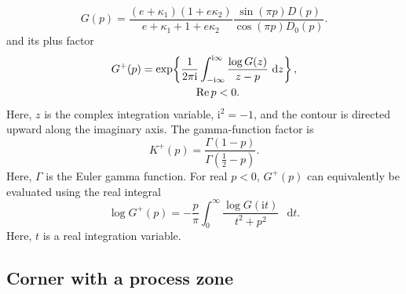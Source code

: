 \documentclass[pdflatex,iicol,sn-mathphys-ay]{sn-jnl}
\newcommand{\dd}{\mathop{}\!\mathrm{d}}
\newcommand{\ii}{\mathrm{i}}
\begin{document}
\begin{appendices}
\begin{equation*}
  G(p)=
  \frac{(e+\kappa_1)(1+e\kappa_2)}
  {e+\kappa_1+1+e\kappa_2}
  \frac{\sin(\pi p)D(p)}
  {\cos(\pi p)D_0(p)}.
\end{equation*}
and its plus factor
{\small
\begin{equation*}
\begin{aligned}
  G^+(p)&=
  \exp\!\left\{
    \frac{1}{2\pi\ii}
    \int_{-\ii\infty}^{\ii\infty}
    \frac{\log G(z)}{z-p}\,\dd z
  \right\},\\[-1pt]
  &\hspace{17mm}\operatorname{Re}p<0.
\end{aligned}
\end{equation*}
}
Here, $z$ is the complex integration variable, $\ii^2=-1$, and the contour
is directed upward along the imaginary axis. The gamma-function factor is
\begin{equation*}
  K^+(p)=\frac{\Gamma(1-p)}{\Gamma(\tfrac12-p)}.
\end{equation*}
Here, $\Gamma$ is the Euler gamma function. For real $p<0$, $G^+(p)$
can equivalently be evaluated using the real integral
\begin{equation*}
  \log G^+(p)
  =-\frac{p}{\pi}\int_0^\infty
    \frac{\log G(\ii t)}{t^2+p^2}\,\dd t.
\end{equation*}
Here, $t$ is a real integration variable.

\subsection{Corner with a process zone}


\end{appendices}
\end{document}
